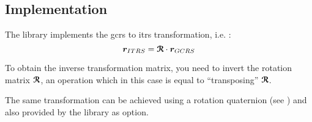 \subsection{Implementation}

The library implements the \gls{gcrs} to \gls{itrs} transformation, i.e. :
\begin{equation}
  \bm{r}_{ITRS} = \bm{\mathcal{R}} \cdot \bm{r}_{GCRS}
\end{equation}

To obtain the inverse transformation matrix, you need to invert the rotation 
matrix $\bm{\mathcal{R}}$, an operation which in this case is equal to ``transposing'' 
$\bm{\mathcal{R}}$.

The same transformation can be achieved using a rotation quaternion (see \cite{Bizouard2023}) 
and also provided by the library as option.

